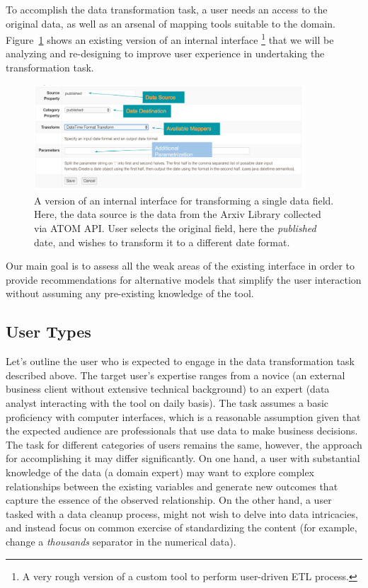 \documentclass[12pt,letterpaper]{article}
\begin{document}
To accomplish the data transformation task, a user needs an access to the original data, as well as an arsenal of mapping tools suitable to the domain. Figure~\ref{fig::2} shows an existing version of an internal interface \footnote{A very rough version of a custom tool to perform user-driven ETL process.} that we will be analyzing and re-designing to improve user experience in undertaking the transformation task. 

\begin{figure}[H]
\centering
\includegraphics[width=4in, scale=.4]{NaraTransform.png}
\caption{A version of an internal interface for transforming a single data field. Here, the data source is the data from the Arxiv Library collected via ATOM API. User selects the original field, here the \textit{published} date, and wishes to transform it to a different date format.}
\label{fig::2}
\end{figure}

Our main goal is to assess all the weak areas of the existing interface in order to provide recommendations for alternative models that simplify the user interaction without assuming any pre-existing knowledge of the tool.

\subsection*{User Types}
Let's outline the user who is expected to engage in the data transformation task described above. The target user's expertise ranges from a novice (an external business client without extensive technical background) to an expert (data analyst interacting with the tool on daily basis). The task assumes a basic proficiency with computer interfaces, which is a reasonable assumption given that the expected audience are professionals that use data to make business decisions. The task for different categories of users remains the same, however, the approach for accomplishing it may differ significantly. On one hand, a user with substantial knowledge of the data (a domain expert) may want to explore complex relationships between the existing variables and generate new outcomes that capture the essence of the observed relationship. On the other hand, a user tasked with a data cleanup process, might not wish to delve into data intricacies, and instead focus on common exercise of standardizing the content (for example, change a \textit{thousands} separator in the numerical data). 
\end{document}
